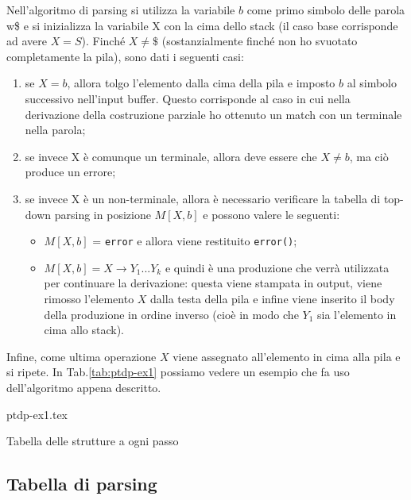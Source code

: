 \documentclass[class=book, crop=false, oneside, 12pt]{standalone}
\begin{document}
Nell'algoritmo di parsing si utilizza la variabile \(b\) come primo simbolo delle parola w\$ e si inizializza la variabile X con la cima dello stack (il caso base corrisponde ad avere \(X = S\)). Finché \(X \neq \$\) (sostanzialmente finché non ho svuotato completamente la pila), sono dati i seguenti casi:

\begin{enumerate}
    \item se \(X = b\), allora tolgo l'elemento dalla cima della pila e imposto \(b\) al simbolo successivo nell'input buffer. Questo corrisponde al caso in cui nella derivazione della costruzione parziale ho ottenuto un match con un terminale nella parola;
    \item se invece X è comunque un terminale, allora deve essere che \(X \neq b\), ma ciò produce un errore;
    \item se invece X è un non-terminale, allora è necessario verificare la tabella di top-down parsing in posizione \(M[X, b]\) e possono valere le seguenti:
    \begin{itemize}
        \item \(M[X, b]\) = \texttt{error} e allora viene restituito \texttt{error()};
        \item \(M[X, b] = X \rightarrow Y_1...Y_k\) e quindi è una produzione che verrà utilizzata per continuare la derivazione: questa viene stampata in output, viene rimosso l'elemento \(X\) dalla testa della pila e infine viene inserito il body della produzione in ordine inverso (cioè in modo che \(Y_1\) sia l'elemento in cima allo stack).
    \end{itemize}
\end{enumerate}

Infine, come ultima operazione \(X\) viene assegnato all'elemento in cima alla pila e si ripete. In Tab.\ref{tab:ptdp-ex1} possiamo vedere un esempio che fa uso dell'algoritmo appena descritto.
\begin{table}[htb]
	\centering
	{ptdp-ex1.tex}
    \caption{Tabella delle strutture a ogni passo}
    \label{tab:ptdp-ex1}
\end{table} 

\subsection{Tabella di parsing}
\end{document}
